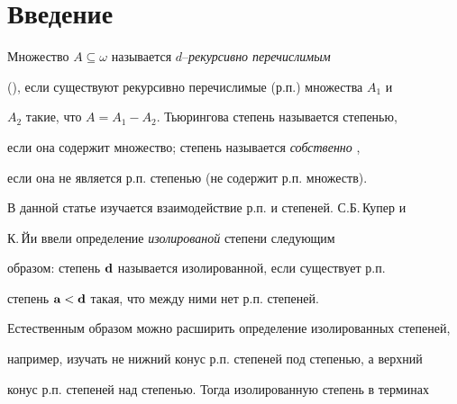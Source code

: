 \date{} 




 


\pagestyle{plain} %


 


 




 


\maketitle 


 





\section{Введение}


Множество  $A\subseteq\omega$ называется $d$--{\it рекурсивно перечислимым}


(\pp), если существуют рекурсивно перечислимые (р.п.) множества  $A_1$ и


$A_2$ такие, что  $A=A_1-A_2$. Тьюрингова степень называется \pp степенью,


если она содержит \pp множество; \pp степень называется {\it собственно} \pp, 


если она не является р.п. степенью (не содержит р.п. множеств).





В данной статье изучается взаимодействие р.п. и \pp степеней. С.Б.\,Купер и 


К.\,Йи \cite{CoYi} ввели определение {\it изолированой} \pp степени следующим


образом: \pp степень ${\bold d}$ называется изолированной, если существует р.п.


степень ${\bold a}<{\bold d}$ такая, что между ними нет р.п. степеней.


Естественным образом можно расширить определение изолированных \pp степеней,


например, изучать не нижний конус р.п. степеней под \pp степенью, а верхний


конус р.п. степеней над \pp степенью. Тогда изолированную степень в терминах 


